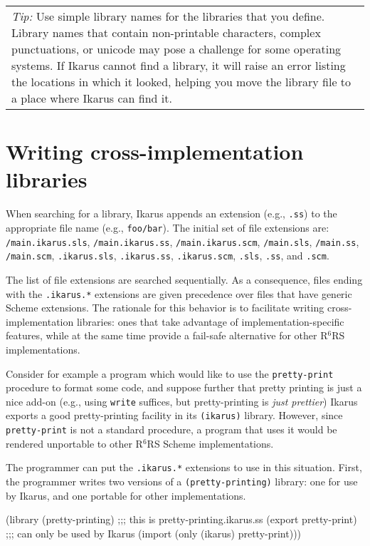 \documentclass[onecolumn, 12pt, twoside, openright, dvipdfm]{book}
\newcommand{\rnrs}[1]{R$^{\mathrm{#1}}$RS}
\newcommand{\BoxedText}[2]{
  \vspace{.05in}
  \begin{center}
    \begin{tabular}{|p{4.6in}|} {\large \emph{#1}} #2 \end{tabular}
  \end{center}
  \vspace{.05in}
}
\begin{document}
\BoxedText{Tip:}{Use simple library names for the libraries that
you define.  Library names that contain non-printable characters,
complex punctuations, or unicode may pose a challenge for some
operating systems.  If Ikarus cannot find a library, it will raise
an error listing the locations in which it looked, helping you move
the library file to a place where Ikarus can find it.}

\section{Writing cross-implementation libraries}

When searching for a library, Ikarus appends an extension (e.g.,
\verb|.ss|) to the appropriate file name (e.g., \verb|foo/bar|).
The initial set of file extensions are: \\
\verb|/main.ikarus.sls|,
\verb|/main.ikarus.ss|, \verb|/main.ikarus.scm|,
\verb|/main.sls|, \verb|/main.ss|, \verb|/main.scm|,
\verb|.ikarus.sls|,
\verb|.ikarus.ss|, \verb|.ikarus.scm|,
\verb|.sls|, \verb|.ss|, and \verb|.scm|.

The list of file extensions are searched sequentially.  As a
consequence, files ending with the \verb|.ikarus.*| extensions are
given precedence over files that have generic Scheme extensions.
The rationale for this behavior is to facilitate writing
cross-implementation libraries: ones that take advantage of
implementation-specific features, while at the same time 
provide a fail-safe alternative for other \rnrs{6}
implementations.

Consider for example a program which would like to use the
\verb|pretty-print| procedure to format some code, and suppose
further that pretty printing is just a nice add-on (e.g., using
\verb|write| suffices, but pretty-printing is \emph{just prettier})
Ikarus exports a good pretty-printing facility in its
\verb|(ikarus)| library.  However, since \verb|pretty-print| is not
a standard procedure, a program that uses it would be rendered
unportable to other \rnrs{6} Scheme implementations.  

The programmer can put the \verb|.ikarus.*| extensions to use in
this situation.  First, the programmer writes two versions of a
\verb|(pretty-printing)| library: one for use by Ikarus, and one
portable for other implementations.

\begin{CodeInline}
(library (pretty-printing) ;;; this is pretty-printing.ikarus.ss
  (export pretty-print)    ;;; can only be used by Ikarus
  (import (only (ikarus) pretty-print)))
\end{CodeInline}
\end{document}

